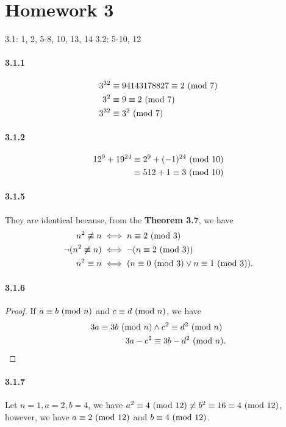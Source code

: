 \documentclass[8pt,twocolumn]{article}
\begin{document}
\section*{Homework 3}
3.1: 1, 2, 5-8, 10, 13, 14
3.2: 5-10, 12

\paragraph{3.1.1}
  \begin{align*}
    3^{32} &\equiv 94143178827 \equiv 2 \ (\mathrm{mod}\ 7) \\
    3^2 &\equiv 9 \equiv 2 \ (\mathrm{mod}\ 7) \\
    3^{32} &\equiv 3^2 \ (\mathrm{mod}\ 7)
  \end{align*}

\paragraph{3.1.2}
  \begin{align*}
    12^{9} + 19^{24} &\equiv 2^9 + (-1)^{24} \ (\mathrm{mod}\ 10) \\
    &\equiv 512 + 1 \equiv 3 \ (\mathrm{mod}\ 10)
  \end{align*}

\paragraph{3.1.5}
They are identical because, from the \textbf{Theorem 3.7}, we have
  \begin{align*}
    n^2 \not\equiv n &\iff n\equiv 2\ (\mathrm{mod}\ 3) \\
    \neg (n^2 \not\equiv n ) &\iff \neg (n\equiv 2\ (\mathrm{mod}\ 3)) \\
    n^2 \equiv n &\iff ( n\equiv 0\ (\mathrm{mod}\ 3) \lor n\equiv 1\ (\mathrm{mod}\ 3) ).
  \end{align*}

\paragraph{3.1.6}
\begin{proof}
  If $a\equiv b\ (\mathrm{mod}\ n)$ and $c\equiv d\ (\mathrm{mod}\ n)$, we have
  \begin{align*}
    3a \equiv 3b \ (\mathrm{mod}\ n) &\land c^2 \equiv d^2 \ (\mathrm{mod}\ n) \\
    3a-c^2 &\equiv 3b - d^2 \ (\mathrm{mod}\ n).
  \end{align*}
\end{proof}

\paragraph{3.1.7}
Let $n=1, a=2, b=4$, we have $a^2 \equiv 4 \ (\mathrm{mod}\ 12) \not\equiv b^2 \equiv 16 \equiv 4 \ (\mathrm{mod}\ 12)$,
however, we have $a\equiv 2 \ (\mathrm{mod}\ 12)$ and $b\equiv 4\ (\mathrm{mod}\ 12)$.
\end{document}

